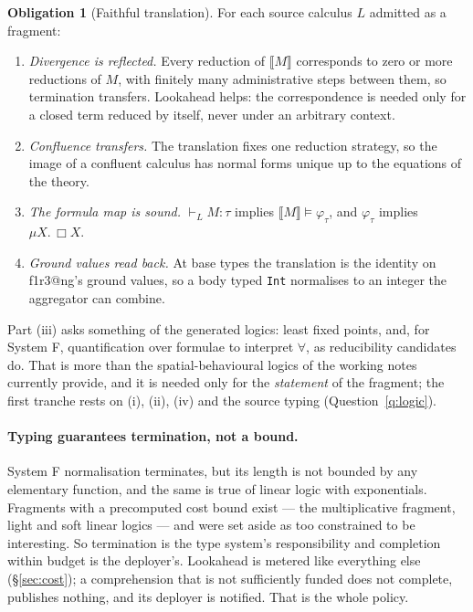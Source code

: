 \documentclass[11pt]{article}
\makeatletter
\theoremstyle{definition}
\newtheorem{obligation}[definition]{Obligation}
\theoremstyle{plain}
\theoremstyle{remark}
\newcommand{\sem}[1]{\llbracket #1 \rrbracket}
\newcommand{\flang}{\textsf{f1r3\textbar @ng}}
\makeatother
\begin{document}
\begin{obligation}[Faithful translation]
\label{obl:fragment}
For each source calculus \(L\) admitted as a fragment:
\begin{enumerate}[nosep,label=(\roman*)]
\item \emph{Divergence is reflected.} Every reduction of \(\sem{M}\) corresponds
to zero or more reductions of \(M\), with finitely many administrative steps
between them, so termination transfers. Lookahead helps: the correspondence is
needed only for a closed term reduced by itself, never under an arbitrary
context.
\item \emph{Confluence transfers.} The translation fixes one reduction strategy,
so the image of a confluent calculus has normal forms unique up to the
equations of the theory.
\item \emph{The formula map is sound.} \(\vdash_L M : \tau\) implies
\(\sem{M} \models \varphi_\tau\), and \(\varphi_\tau\) implies
\(\mu X.\,\Box X\).
\item \emph{Ground values read back.} At base types the translation is the
identity on \flang{}'s ground values, so a body typed \texttt{Int} normalises to
an integer the aggregator can combine.
\end{enumerate}
\end{obligation}

\noindent
Part (iii) asks something of the generated logics: least fixed points, and,
for System F, quantification over formulae to interpret \(\forall\), as
reducibility candidates do. That is more than the spatial-behavioural logics of
the working notes currently provide, and it is needed only for the
\emph{statement} of the fragment; the first tranche rests on (i), (ii), (iv)
and the source typing (Question~\ref{q:logic}).

\paragraph{Typing guarantees termination, not a bound.} System F normalisation
terminates, but its length is not bounded by any elementary function, and the
same is true of linear logic with exponentials. Fragments with a precomputed
cost bound exist --- the multiplicative fragment, light and soft linear logics
--- and were set aside as too constrained to be interesting. So termination is
the type system's responsibility and completion within budget is the
deployer's. Lookahead is metered like everything else (\S\ref{sec:cost}); a
comprehension that is not sufficiently funded does not complete, publishes
nothing, and its deployer is notified. That is the whole policy.
\end{document}
